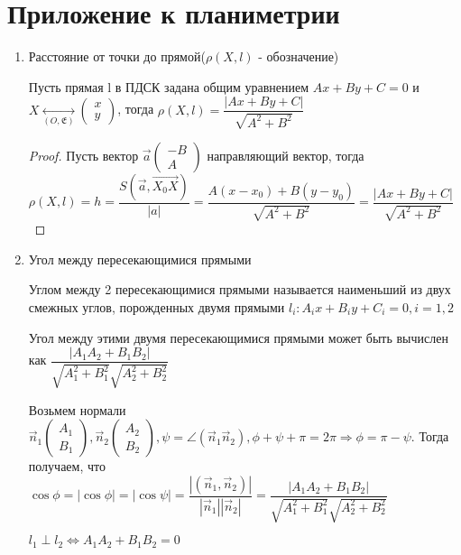 \section{Приложение к планиметрии}
\begin{enumerate}
	\item Расстояние от точки до прямой(\(\rho(X, l)\) - обозначение)
	\begin{proposition}
		Пусть прямая l в ПДСК задана общим уравнением \(Ax+By+C = 0\) и \(X\underset{(O, \mathfrak{E})}{\longleftrightarrow}\begin{pmatrix}
			x \\ y
		\end{pmatrix}\), тогда \(\rho(X, l) = \dfrac{|Ax+By+C|}{\sqrt{A^2+B^2}}\)
	\end{proposition}
	\begin{proof}
		Пусть вектор \(\vec a\begin{pmatrix}
			-B \\ A
		\end{pmatrix}\) направляющий вектор, тогда \(\rho(X, l) = h = \dfrac{S(\vec a, \vec{X_0X})}{|a|} = \dfrac{{A(x-x_0)+B(y-y_0)}}{\sqrt{A^2+B^2}} = \dfrac{|Ax+By+C|}{\sqrt{A^2+B^2}}\)
	\end{proof}
	\item Угол между пересекающимися прямыми
	\begin{definition}
		Углом между 2 пересекающимися прямыми называется наименьший из двух смежных углов, порожденных двумя прямыми \(l_i: A_ix+B_iy+C_i = 0, i= 1,2\)
	\end{definition}
	\begin{proposition}
		Угол между этими двумя пересекающимися прямыми может быть вычислен как \(\dfrac{|A_1A_2+B_1B_2|}{\sqrt{A_1^2+B_1^2}\sqrt{A_2^2+B_2^2}}\)
	\end{proposition}
	Возьмем нормали \(\vec n_1\begin{pmatrix}
		A_1 \\ B_1
	\end{pmatrix}, \vec n_2\begin{pmatrix}
		A_2 \\ B_2
	\end{pmatrix},
	 \psi = \angle(\vec n_1  \vec n_2), \phi + \psi + \pi = 2\pi \Longrightarrow \phi = \pi - \psi\). 
	 Тогда получаем, что \(\cos\phi = |\cos\phi| = |\cos\psi| = \dfrac{|(\vec n_1, \vec n_2)|}{|\vec n_1||\vec n_2|} =
	  \dfrac{|A_1A_2+B_1B_2|}{\sqrt{A_1^2+B_1^2}\sqrt{A_2^2+B_2^2}}\)
	  \begin{corollary}
	  	\(l_1 \perp l_2\Longleftrightarrow A_1A_2+B_1B_2 = 0\)
	  \end{corollary}
\end{enumerate}
